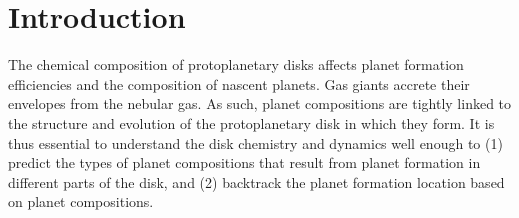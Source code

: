 \documentclass[apj]{emulateapj}
\newcommand{\emgr}[1]{\emph{ \color{gray} #1}}
\begin{document}
\section{Introduction}
\label{sec:intro}



The chemical composition of protoplanetary disks affects planet formation efficiencies and the composition of nascent planets.
Gas giants accrete their envelopes from the nebular gas. As such, planet compositions are tightly linked to the structure and evolution of the protoplanetary disk in which they form. It is thus essential to understand the disk chemistry and dynamics well enough to (1) predict the types of planet compositions that result from planet formation in different parts of the disk, and (2) backtrack the planet formation location based on planet compositions. %





\end{document}
